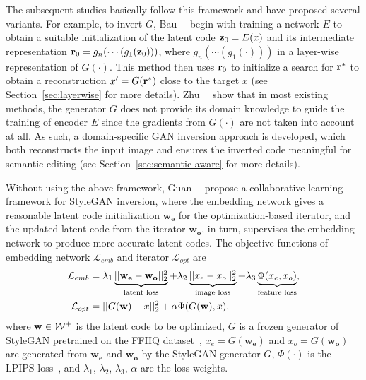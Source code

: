 The subsequent studies basically follow this framework and have proposed several variants.
For example, to invert $G$, Bau~\etal~\cite{bau2019inverting} begin with training a network $E$ to obtain a suitable initialization of the latent code $\mathbf{z}_{0}=E(x)$ and its intermediate representation $\mathbf{r}_{0}=g_{n}(\cdots(g_{1}(\mathbf{z}_{0})))$, where $g_{n}(\cdots(g_{1}(\cdot)))$ in a layer-wise representation of $G(\cdot)$.
This method then uses $\mathbf{r}_{0}$ to initialize a search for $\mathbf{r}^{*}$ to obtain a reconstruction $x^{\prime}=G(\mathbf{r}^{*})$ close to the target $x$ 
(see Section~\ref{sec:layerwise} for more details).
Zhu~\etal~\cite{zhu2020indomain} show that in most existing methods, the generator $G$ does not provide its domain knowledge to guide the training of encoder $E$ since the gradients from $G(\cdot)$ are not taken into account at all. 
As such, a domain-specific GAN inversion approach is developed, which both reconstructs the input image and ensures the inverted code meaningful for semantic editing 
(see Section~\ref{sec:semantic-aware} for more details).

Without using the above framework, Guan~\etal~\cite{guan2020faster} propose a collaborative learning framework for StyleGAN inversion, where the embedding network gives a reasonable latent code initialization $\mathbf{w_e}$ for the optimization-based iterator, and the updated latent code from the iterator $\mathbf{w_o}$, in turn, supervises the embedding network to produce more accurate latent codes. The objective functions of embedding network $\mathcal{L}_{emb}$ and iterator $\mathcal{L}_{opt}$ are 
\begin{equation}
\begin{aligned}
\mathcal{L}_{emb} & = \lambda_1 \underbrace{||\mathbf{w_e} - \mathbf{w_o}||_2^2}_{\text{latent loss}} + \lambda_2 \underbrace{||{x_e} - {x_o}||_2^2}_{\text{image loss}} + \lambda_3 \underbrace{\Phi({x_e}, {x_o})}_{\text{feature loss}}, \\
\mathcal{L}_{opt} & = ||G(\mathbf{w}) - {x}||_2^2 + \alpha \Phi(G(\mathbf{w}), x),\\
\end{aligned}
\end{equation}
where $\mathbf{w} \in \mathcal{W^+}$ is the latent code to be optimized, $G$ is a frozen generator of StyleGAN pretrained on the FFHQ dataset~\cite{karras2019style}, ${x_e} = G(\mathbf{w_e})$ and ${x_o} = G(\mathbf{w_o})$ are generated from $\mathbf{w_e}$ and $\mathbf{w_o}$ by the StyleGAN generator $G$, $\Phi(\cdot)$ is the LPIPS loss~\cite{zhang2018unreasonable}, and $\lambda_1$, $\lambda_2$, $\lambda_3$, $\alpha$ are the loss weights.


